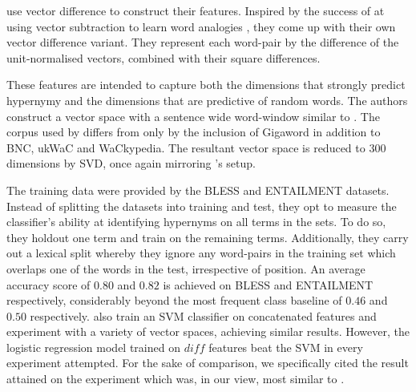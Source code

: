 \citet{roller2014inclusive} use vector difference to construct their features.  Inspired by the success of \citeauthor{mikolov2013distributed} at using vector subtraction to learn word analogies \citep{mikolov2013distributed}, they come up with their own vector difference variant.  They represent each word-pair by the difference of the unit-normalised vectors, combined with their square differences.  

These features are intended to capture both the dimensions that strongly predict hypernymy and the dimensions that are predictive of random words.
The authors construct a vector space with a sentence wide word-window similar to \citet{baroni2012entailment}.  The corpus used by \citet{roller2014inclusive} differs from \citet{baroni2012entailment} only by the inclusion of Gigaword in addition to BNC, ukWaC and WaCkypedia.  The resultant vector space is reduced to $300$ dimensions by \ac{SVD}, once again mirroring \citeauthor{baroni2012entailment}'s setup.  

The training data were provided by the BLESS and ENTAILMENT datasets.  Instead of splitting the datasets into training and test, they opt to measure the classifier’s ability at identifying hypernyms on all terms in the sets.  To do so, they holdout one term and train on the remaining terms.  Additionally, they carry out a lexical split whereby they ignore any word-pairs in the training set which overlaps one of the words in the test, irrespective of position.  An average accuracy score of $0.80$ and $0.82$ is achieved on BLESS and ENTAILMENT respectively, considerably beyond the most frequent class baseline of $0.46$ and $0.50$ respectively.  \citeauthor{roller2014inclusive} also train an \ac{SVM} classifier on concatenated features and experiment with a variety of vector spaces, achieving similar results.  However, the logistic regression model trained on $diff$ features beat the \ac{SVM} in every experiment attempted.  For the sake of comparison, we specifically cited the result attained on the experiment which was, in our view, most similar to \citep{baroni2012entailment}.

